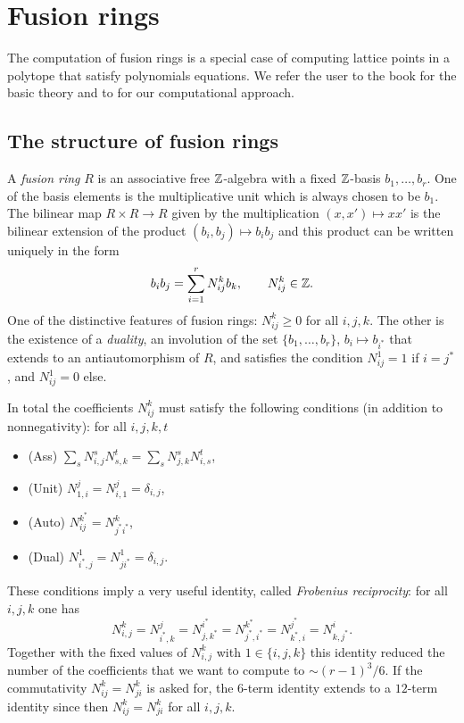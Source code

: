 \section{Fusion rings}\label{fusion_rings}

The computation of fusion rings is a special case of computing lattice points in a polytope that satisfy polynomials equations. We refer the user to the book \cite{EGNO} for the basic theory and to \cite{ABPP} for our computational approach.

\subsection{The structure of fusion rings}\label{fusion_structure}

A \emph{fusion ring} $R$ is an associative free ${\mathbb Z}$-algebra with a fixed ${\mathbb Z}$-basis $b_1,\dots,b_r$. One of the basis elements is the multiplicative unit which is always chosen to be $b_1$. The bilinear map $R\times R\to R$ given by the multiplication $(x,x')\mapsto xx'$ is the bilinear extension of the product $(b_i, b_j)\mapsto b_ib_j$ and this product can be written uniquely in the form
$$
b_i b_j = \sum_{i=1}^r N_{ij}^k b_k, \qquad N_{ij}^k\in {\mathbb Z}.
$$
One of the  distinctive features of fusion rings: $N_{ij}^k\ge 0$ for all $i,j,k$. The other is the existence of a \emph{duality}, an involution of the set $\{b_1,\dots,b_r\}$, $b_i\mapsto b_{i^*}$ that extends to an antiautomorphism of $R$, and satisfies the condition $N_{ij}^1 = 1$ if $i=j^*$, and $N_{ij}^1 = 0$ else.

In total the coefficients $N_{ij}^k$ must satisfy the following conditions (in addition to nonnegativity): for all $i,j,k,t$
\begin{itemize}
	\item (Ass) $\sum_s N_{i,j}^s N_{s,k}^t = \sum_s N_{j,k}^s N_{i,s}^t$,		
	\item (Unit) $N_{1,i}^j = N_{i,1}^j = \delta_{i,j}$,	
	\item (Auto) $N_{ij}^{k^*} = N_{j^*i^*}^k$,			
	\item (Dual) $N_{i^*,j}^{1} = N_{ji^*}^{1} = \delta_{i,j}$.					
\end{itemize}

These conditions imply a very useful identity, called \emph{Frobenius reciprocity}:
for all $i,j,k$ one has
$$
N_{i,j}^k = N_{i^*,k}^j = N_{j,k^*}^{i^*} = N_{j^*, i^*}^{k^*} = N_{k^*, i}^{j^*} = N_{k, j^*}^{i}.
$$
Together with the fixed values of $N_{i,j}^k$ with $1\in\{i,j,k\}$ this identity reduced the number of the coefficients that we want to compute to $\sim (r-1)^3/6$. If the commutativity $N_{ij}^k = N_{ji}^k$ is asked for, the $6$-term identity extends to a $12$-term identity since then $N_{ij}^k= N_{ji}^k$ for all $i,j,k$. 

